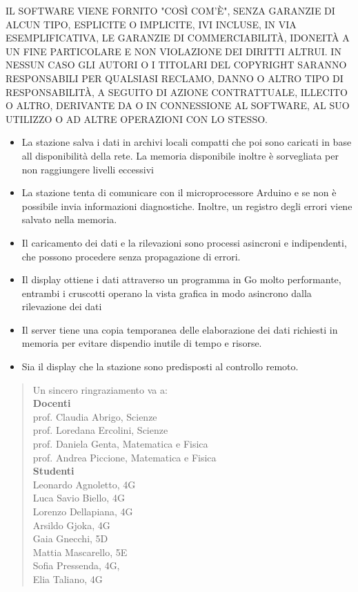 \documentclass{article}
\begin{document}
IL SOFTWARE VIENE FORNITO "COSÌ COM'È", SENZA GARANZIE DI ALCUN TIPO, ESPLICITE O IMPLICITE, IVI INCLUSE, IN VIA ESEMPLIFICATIVA, LE GARANZIE DI COMMERCIABILITÀ, IDONEITÀ A UN FINE PARTICOLARE E NON VIOLAZIONE DEI DIRITTI ALTRUI. IN NESSUN CASO GLI AUTORI O I TITOLARI DEL COPYRIGHT SARANNO RESPONSABILI PER QUALSIASI RECLAMO, DANNO O ALTRO TIPO DI RESPONSABILITÀ, A SEGUITO DI AZIONE CONTRATTUALE, ILLECITO O ALTRO, DERIVANTE DA O IN CONNESSIONE AL SOFTWARE, AL SUO UTILIZZO O AD ALTRE OPERAZIONI CON LO STESSO.
\begin{itemize}
\item La stazione salva i dati in archivi locali compatti che poi sono caricati in base all disponibilità della rete. La memoria disponibile inoltre è sorvegliata per non raggiungere livelli eccessivi
\item La stazione tenta di comunicare con il microprocessore Arduino e se non è possibile invia informazioni diagnostiche. Inoltre, un registro degli errori viene salvato nella memoria.\\
\item Il caricamento dei dati e la rilevazioni sono processi asincroni e indipendenti, che possono procedere senza propagazione di errori.\\
\item Il display ottiene i dati attraverso un programma in Go molto performante, entrambi i cruscotti operano la vista grafica in modo asincrono dalla rilevazione dei dati\\
\item Il server tiene una copia temporanea delle elaborazione dei dati richiesti in memoria per evitare dispendio inutile di tempo e risorse. \\
\item Sia il display che la stazione sono predisposti al controllo remoto.
\end{itemize}
\pagebreak
\renewcommand{\abstractname}{Riconoscimenti}
\begin{center}
\begin{abstract}
Un sincero ringraziamento va a:\\
\textbf{Docenti}\\
 prof. Claudia Abrigo, Scienze\\
 prof. Loredana Ercolini, Scienze\\
 prof. Daniela Genta, Matematica e Fisica\\
 prof. Andrea Piccione, Matematica e Fisica\\
\textbf{Studenti}\\
Leonardo Agnoletto, 4G\\
Luca Savio Biello, 4G\\
Lorenzo Dellapiana, 4G\\
Arsildo Gjoka, 4G\\
Gaia Gnecchi, 5D\\
Mattia Mascarello, 5E\\
Sofia Pressenda, 4G,\\
Elia Taliano, 4G\\
\end{abstract}
\end{center}
\end{document}
